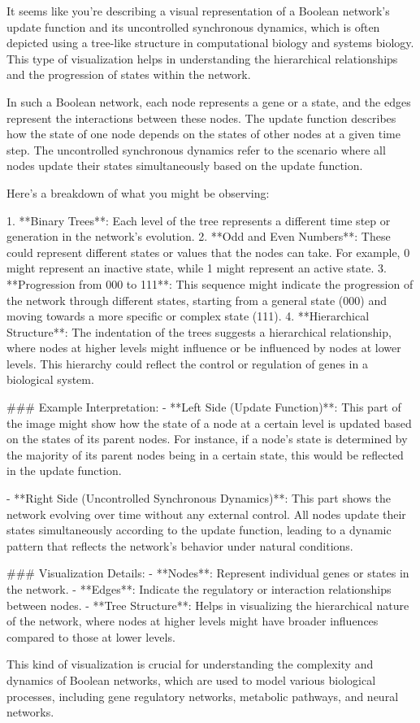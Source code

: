 It seems like you're describing a visual representation of a Boolean network's update function and its uncontrolled synchronous dynamics, which is often depicted using a tree-like structure in computational biology and systems biology. This type of visualization helps in understanding the hierarchical relationships and the progression of states within the network.

In such a Boolean network, each node represents a gene or a state, and the edges represent the interactions between these nodes. The update function describes how the state of one node depends on the states of other nodes at a given time step. The uncontrolled synchronous dynamics refer to the scenario where all nodes update their states simultaneously based on the update function.

Here’s a breakdown of what you might be observing:

1. **Binary Trees**: Each level of the tree represents a different time step or generation in the network's evolution.
2. **Odd and Even Numbers**: These could represent different states or values that the nodes can take. For example, 0 might represent an inactive state, while 1 might represent an active state.
3. **Progression from 000 to 111**: This sequence might indicate the progression of the network through different states, starting from a general state (000) and moving towards a more specific or complex state (111).
4. **Hierarchical Structure**: The indentation of the trees suggests a hierarchical relationship, where nodes at higher levels might influence or be influenced by nodes at lower levels. This hierarchy could reflect the control or regulation of genes in a biological system.

### Example Interpretation:
- **Left Side (Update Function)**: This part of the image might show how the state of a node at a certain level is updated based on the states of its parent nodes. For instance, if a node's state is determined by the majority of its parent nodes being in a certain state, this would be reflected in the update function.
  
- **Right Side (Uncontrolled Synchronous Dynamics)**: This part shows the network evolving over time without any external control. All nodes update their states simultaneously according to the update function, leading to a dynamic pattern that reflects the network's behavior under natural conditions.

### Visualization Details:
- **Nodes**: Represent individual genes or states in the network.
- **Edges**: Indicate the regulatory or interaction relationships between nodes.
- **Tree Structure**: Helps in visualizing the hierarchical nature of the network, where nodes at higher levels might have broader influences compared to those at lower levels.

This kind of visualization is crucial for understanding the complexity and dynamics of Boolean networks, which are used to model various biological processes, including gene regulatory networks, metabolic pathways, and neural networks.